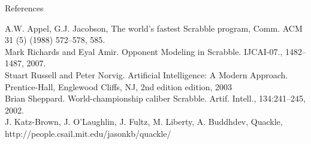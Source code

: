 \documentclass[12pt]{article}
\begin{document}
\vspace{ 8cm }
\clearpage
\begin{center}
{\Large References}
\end{center} 
A.W. Appel, G.J. Jacobson, The world’s fastest Scrabble program, Comm. ACM 31 (5) (1988) 572–578, 585. \\
Mark Richards and Eyal Amir. Opponent Modeling in Scrabble. IJCAI-07., 1482–1487, 2007. \\
Stuart Russell and Peter Norvig. Artificial Intelligence: A Modern Approach. Prentice-Hall,
Englewood Cliffs, NJ, 2nd edition edition, 2003 \\
Brian Sheppard. World-championship caliber Scrabble. Artif. Intell., 134:241–245, 2002. \\
J. Katz-Brown, J. O'Laughlin, J. Fultz, M. Liberty, A. Buddhdev, Quackle, http://people.csail.mit.edu/jasonkb/quackle/
\end{document}
